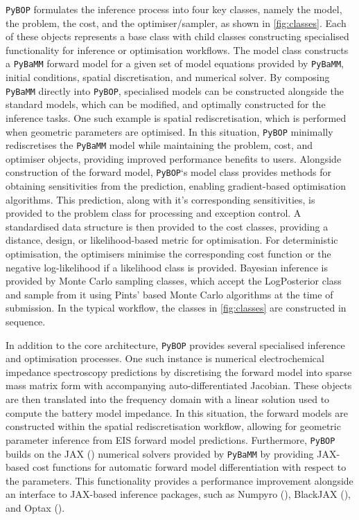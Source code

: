 \documentclass[
]{article}
\begin{document}
\texttt{PyBOP} formulates the inference process into four key classes,
namely the model, the problem, the cost, and the optimiser/sampler, as
shown in \autoref{fig:classes}. Each of these objects represents a base
class with child classes constructing specialised functionality for
inference or optimisation workflows. The model class constructs a
\texttt{PyBaMM} forward model for a given set of model equations
provided by \texttt{PyBaMM}, initial conditions, spatial discretisation,
and numerical solver. By composing \texttt{PyBaMM} directly into
\texttt{PyBOP}, specialised models can be constructed alongside the
standard models, which can be modified, and optimally constructed for
the inference tasks. One such example is spatial rediscretisation, which
is performed when geometric parameters are optimised. In this situation,
\texttt{PyBOP} minimally rediscretises the \texttt{PyBaMM} model while
maintaining the problem, cost, and optimiser objects, providing improved
performance benefits to users. Alongside construction of the forward
model, \texttt{PyBOP}`s model class provides methods for obtaining
sensitivities from the prediction, enabling gradient-based optimisation
algorithms. This prediction, along with it's corresponding
sensitivities, is provided to the problem class for processing and
exception control. A standardised data structure is then provided to the
cost classes, providing a distance, design, or likelihood-based metric
for optimisation. For deterministic optimisation, the optimisers
minimise the corresponding cost function or the negative log-likelihood
if a likelihood class is provided. Bayesian inference is provided by
Monte Carlo sampling classes, which accept the LogPosterior class and
sample from it using Pints' based Monte Carlo algorithms at the time of
submission. In the typical workflow, the classes in
\autoref{fig:classes} are constructed in sequence.

In addition to the core architecture, \texttt{PyBOP} provides several
specialised inference and optimisation processes. One such instance is
numerical electrochemical impedance spectroscopy predictions by
discretising the forward model into sparse mass matrix form with
accompanying auto-differentiated Jacobian. These objects are then
translated into the frequency domain with a linear solution used to
compute the battery model impedance. In this situation, the forward
models are constructed within the spatial rediscretisation workflow,
allowing for geometric parameter inference from EIS forward model
predictions. Furthermore, \texttt{PyBOP} builds on the JAX
() numerical solvers
provided by \texttt{PyBaMM} by providing JAX-based cost functions for
automatic forward model differentiation with respect to the parameters.
This functionality provides a performance improvement alongside an
interface to JAX-based inference packages, such as Numpyro
(), BlackJAX
(), and Optax
().
\end{document}
